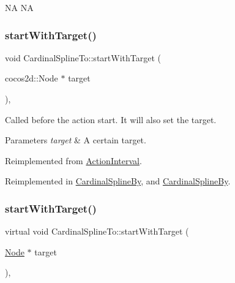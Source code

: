 NA  NA \mbox{\label{classCardinalSplineTo_ab1e28aab8fe748bd90cc370efc52bef5}} 
\subsubsection{\texorpdfstring{start\+With\+Target()}{startWithTarget()}\hspace{0.1cm}{\footnotesize\ttfamily [1/2]}}
{\footnotesize\ttfamily void Cardinal\+Spline\+To\+::start\+With\+Target (\begin{DoxyParamCaption}\item[{cocos2d\+::\+Node $\ast$}]{target }\end{DoxyParamCaption})\hspace{0.3cm}{\ttfamily [override]}, {\ttfamily [virtual]}}

Called before the action start. It will also set the target.


\begin{DoxyParams}{Parameters}
{\em target} & A certain target. \\
\hline
\end{DoxyParams}


Reimplemented from \hyperlink{classActionInterval_ad3d91186b2c3108488ddbbdbbd982484}{Action\+Interval}.



Reimplemented in \hyperlink{classCardinalSplineBy_a913fc62fee3b78dcdeb76b9bf8d05b35}{Cardinal\+Spline\+By}, and \hyperlink{classCardinalSplineBy_aaf4bff6ebce3d2ccf6dfaa71678d4462}{Cardinal\+Spline\+By}.

\mbox{\label{classCardinalSplineTo_a395a93dfe6f1d9e9298236bd44f04ade}} 
\subsubsection{\texorpdfstring{start\+With\+Target()}{startWithTarget()}\hspace{0.1cm}{\footnotesize\ttfamily [2/2]}}
{\footnotesize\ttfamily virtual void Cardinal\+Spline\+To\+::start\+With\+Target (\begin{DoxyParamCaption}\item[{\hyperlink{classNode}{Node} $\ast$}]{target }\end{DoxyParamCaption})\hspace{0.3cm}{\ttfamily [override]}, {\ttfamily [virtual]}}

